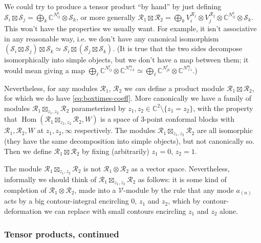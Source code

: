 \documentclass[12pt,letterpaper,reqno]{amsart}
\numberwithin{equation}{section}
\newcommand{\cS}{\ensuremath{\mathcal S}}
\newcommand{\bbC}{\ensuremath{\mathbb C}}
\newcommand{\vertex}{\mathcal{V}}
\newcommand{\vrep}{\mathcal{R}}
\newcommand{\ti}[1]{\textit{#1}}
\DeclareMathOperator{\Hom}{Hom}
\begin{document}
We could try to produce a tensor product ``by hand'' by just
defining $\cS_i \boxtimes \cS_j = \bigoplus_{k} \bbC^{N_{ij}^k} \otimes \cS_k$, or more generally
$\vrep_1 \boxtimes \vrep_2 = \bigoplus_k V^{\vrep_1}_i \otimes V^{\vrep_2}_j \otimes \bbC^{N_{ij}^k} \otimes \cS_k$.
This won't have the properties we usually want.
For example, it isn't associative in any reasonable way,
i.e. we don't have any canonical isomorphism
$(\cS_i \boxtimes \cS_j) \boxtimes \cS_k \simeq \cS_i \boxtimes (\cS_j \boxtimes \cS_k)$. (It is true that the two sides decompose isomorphically into simple objects, but we don't have
a map between them; it would mean giving a map
$\bigoplus_\ell \bbC^{N_{ij}^\ell} \otimes \bbC^{N_{\ell k}^m} \simeq \bigoplus_\ell \bbC^{N_{jk}^\ell} \otimes \bbC^{N_{\ell i}^m}$.)


Nevertheless, for any modules $\vrep_1$, $\vrep_2$ we \ti{can} define a product module 
$\vrep_1 \boxtimes \vrep_2$, for which we do have \eqref{eq:boxtimes-coeff}.
More canonically 
we have a family of modules $\vrep_1 \boxtimes_{z_1,z_2} \vrep_2$ 
parameterized by $z_1, z_2 \in \bbC^2 \setminus \{z_1 = z_2\}$,
with the property that
$\Hom(\vrep_1 \boxtimes_{z_1,z_2} \vrep_2, W)$
is a space of 3-point conformal blocks with
$\vrep_1, \vrep_2, W$ at $z_1, z_2, \infty$ respectively.
The modules $\vrep_1 \boxtimes_{z_1,z_2} \vrep_2$ are all isomorphic (they have the same decomposition into simple objects), 
but not canonically so.
Then we define $\vrep_1 \boxtimes \vrep_2$ by fixing (arbitrarily) $z_1 = 0$, $z_2 = 1$.

The module
$\vrep_1 \boxtimes_{z_1,z_2} \vrep_2$ is not $\vrep_1 \otimes \vrep_2$ as a vector space.
Nevertheless, informally we should think of $\vrep_1 \boxtimes_{z_1,z_2} \vrep_2$ as follows: it is some kind of completion of $\vrep_1 \otimes \vrep_2$,
made into a $\vertex$-module by the rule that any mode $a_{(n)}$ acts
by a big contour-integral encircling $0$, $z_1$ and $z_2$,
which by contour-deformation we can replace with small contours 
encircling $z_1$ and $z_2$ alone.

\subsubsection{Tensor products, continued}
\end{document}
